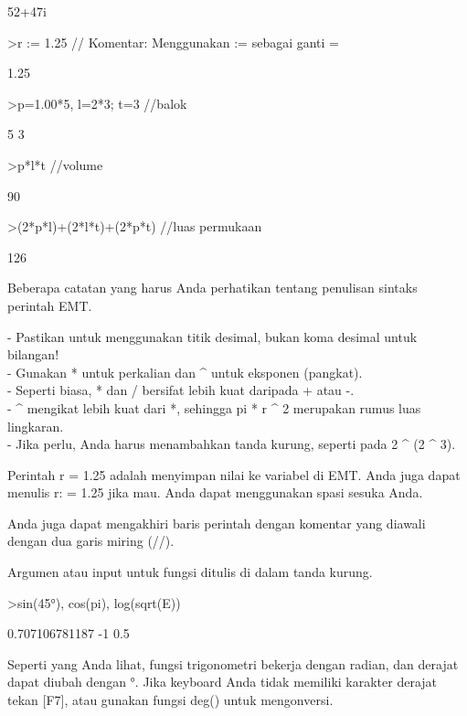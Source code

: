 \documentclass[12pt,arial,letterpaper]{book}
\begin{document}
\begin{eulernootebook}
\begin{eulercomment}
\begin{eulercomment}
\begin{euleroutput}
  52+47i
\end{euleroutput}
\begin{eulerprompt}
>r := 1.25 // Komentar: Menggunakan  := sebagai ganti =
\end{eulerprompt}
\begin{euleroutput}
  1.25
\end{euleroutput}
\begin{eulerprompt}
>p=1.00*5, l=2*3; t=3 //balok
\end{eulerprompt}
\begin{euleroutput}
  5
  3
\end{euleroutput}
\begin{eulerprompt}
>p*l*t //volume
\end{eulerprompt}
\begin{euleroutput}
  90
\end{euleroutput}
\begin{eulerprompt}
>(2*p*l)+(2*l*t)+(2*p*t) //luas permukaan
\end{eulerprompt}
\begin{euleroutput}
  126
\end{euleroutput}
\eulersubheading{}
\begin{eulercomment}
Beberapa catatan yang harus Anda perhatikan tentang penulisan sintaks
perintah EMT.

- Pastikan untuk menggunakan titik desimal, bukan koma desimal untuk
bilangan!\\
- Gunakan * untuk perkalian dan \textasciicircum{} untuk eksponen (pangkat).\\
- Seperti biasa, * dan / bersifat lebih kuat daripada + atau -.\\
- \textasciicircum{} mengikat lebih kuat dari *, sehingga pi * r \textasciicircum{} 2 merupakan rumus
luas lingkaran.\\
- Jika perlu, Anda harus menambahkan tanda kurung, seperti pada 2 \textasciicircum{} (2
\textasciicircum{} 3).

Perintah r = 1.25 adalah menyimpan nilai ke variabel di EMT. Anda juga
dapat menulis r: = 1.25 jika mau. Anda dapat menggunakan spasi sesuka
Anda.

Anda juga dapat mengakhiri baris perintah dengan komentar yang diawali
dengan dua garis miring (//).

Argumen atau input untuk fungsi ditulis di dalam tanda kurung.
\end{eulercomment}
\begin{eulerprompt}
>sin(45°), cos(pi), log(sqrt(E))
\end{eulerprompt}
\begin{euleroutput}
  0.707106781187
  -1
  0.5
\end{euleroutput}
\begin{eulercomment}
Seperti yang Anda lihat, fungsi trigonometri bekerja dengan radian, dan derajat
dapat diubah dengan °. Jika keyboard Anda tidak memiliki karakter derajat tekan
[F7], atau gunakan fungsi deg() untuk mengonversi.


\end{eulercomment}
\end{eulercomment}
\end{eulercomment}
\end{eulernootebook}
\end{document}
